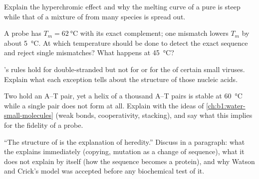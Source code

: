 \begin{exercise}[$\star\star$]\label{exo:b1:nucleic-acids:8}
Explain the hyperchromic effect and why the melting curve of a pure
 is steep while that of a mixture of  from many species is
spread out.
\end{exercise}

\begin{exercise}[$\star\star$]\label{exo:b1:nucleic-acids:9}
A  probe has $T_m = \qty{62}{\celsius}$ with its exact
complement; one mismatch lowers $T_m$ by about \qty{5}{\celsius}. At
which temperature should  be done to detect the exact
sequence and reject single mismatches? What happens at
\qty{45}{\celsius}?
\end{exercise}

\begin{exercise}[$\star\star\star$]\label{exo:b1:nucleic-acids:10}
's rules hold for double-stranded  but not for  or for
the  of certain small viruses. Explain what each exception tells
about the structure of those nucleic acids.
\end{exercise}

\begin{exercise}[$\star\star\star$]\label{exo:b1:nucleic-acids:11}
Two  hold an A--T pair, yet a helix of a thousand A--T
pairs is stable at \qty{60}{\celsius} while a single pair does not
form at all. Explain with the ideas of \cref{ch:b1:water-small-molecules}
(weak bonds, cooperativity, stacking), and say what this implies for
the fidelity of a probe.
\end{exercise}

\begin{exercise}[$\star\star\star$]\label{exo:b1:nucleic-acids:12}
``The structure of  is the explanation of heredity.'' Discuss in a
paragraph: what the  explains immediately (copying,
mutation as a change of sequence), what it does not explain by itself
(how the sequence becomes a protein), and why Watson and Crick's model
was accepted before any biochemical test of it.
\end{exercise}

